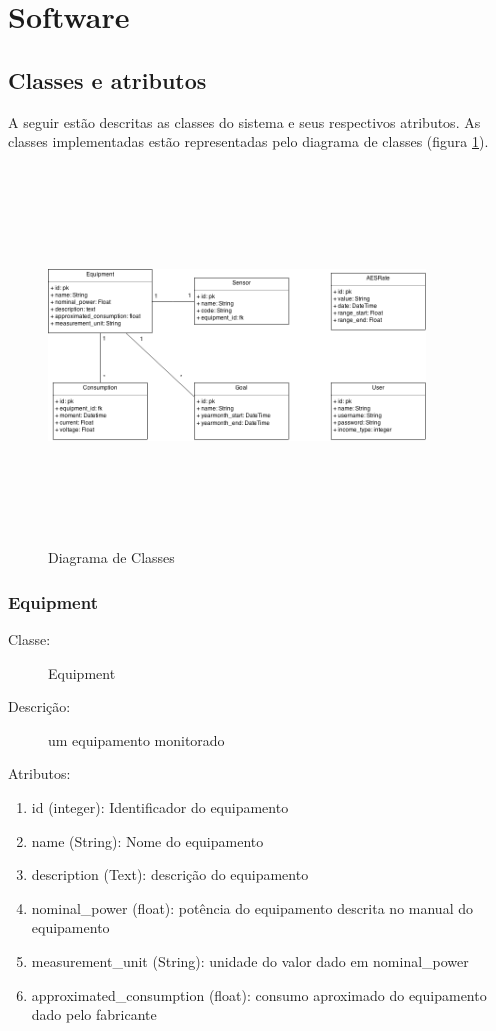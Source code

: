 \section{Software}
\label{Sec:software}

\subsection{Classes e atributos}

A seguir estão descritas as classes do sistema e seus respectivos atributos. As classes implementadas estão representadas pelo diagrama de classes (figura \ref{fig:diagrama-classes}).

\begin{figure}[H]
\begin{center}
\includegraphics[width=10cm,height=10cm,keepaspectratio]{figuras/diagrama_classes.png}
\caption{\label{fig:diagrama-classes} Diagrama de Classes}
\end{center}
\end{figure}

\subsubsection{Equipment}
\begin{description}
	\item[Classe:] Equipment
	\item[Descrição:] um equipamento monitorado
	\item[Atributos:]
\end{description} 
\begin{enumerate}
  \item id (integer): Identificador do equipamento
  \item name (String): Nome do equipamento
  \item description (Text): descrição do equipamento 
  \item nominal\_power (float): potência do equipamento descrita no manual do equipamento 
  \item measurement\_unit (String): unidade do valor dado em nominal\_power
  \item approximated\_consumption (float): consumo aproximado do equipamento dado pelo fabricante 
\end{enumerate}
%
